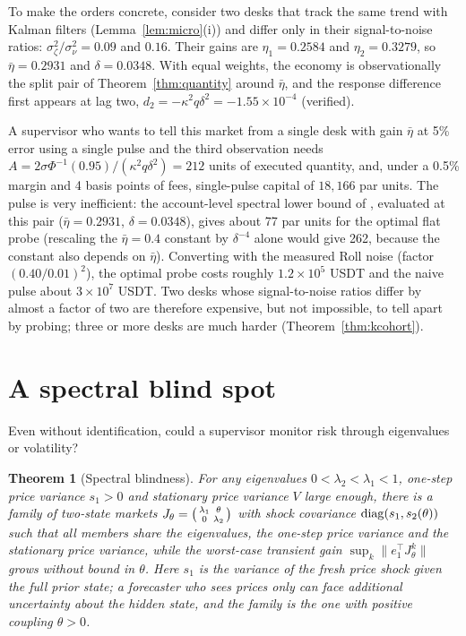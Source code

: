 \documentclass[12pt]{article}
\newtheorem{theorem}{Theorem}[section]
\theoremstyle{definition}
\theoremstyle{remark}
\begin{document}
To make the orders concrete, consider two desks that track the same trend with Kalman filters (Lemma~\ref{lem:micro}(i)) and differ only in their signal-to-noise ratios: $\sigma_\zeta^2/\sigma_\nu^2=0.09$ and $0.16$. Their gains are $\eta_1=0.2584$ and $\eta_2=0.3279$, so $\bar\eta=0.2931$ and $\delta=0.0348$. With equal weights, the economy is observationally the split pair of Theorem~\ref{thm:quantity} around $\bar\eta$, and the response difference first appears at lag two, $d_2=-\kappa^2q\delta^2=-1.55\times10^{-4}$ (verified).

A supervisor who wants to tell this market from a single desk with gain $\bar\eta$ at 5\% error using a single pulse and the third observation needs $A=2\sigma\Phi^{-1}(0.95)/(\kappa^2q\delta^2)=212$ units of executed quantity, and, under a 0.5\% margin and 4 basis points of fees, single-pulse capital of $18{,}166$ par units. The pulse is very inefficient: the account-level spectral lower bound of \citet{niroula2026a}, evaluated at this pair ($\bar\eta=0.2931$, $\delta=0.0348$), gives about 77 par units for the optimal flat probe (rescaling the $\bar\eta=0.4$ constant by $\delta^{-4}$ alone would give 262, because the constant also depends on $\bar\eta$). Converting with the measured Roll noise (factor $(0.40/0.01)^2$), the optimal probe costs roughly $1.2\times10^5$ USDT and the naive pulse about $3\times10^7$ USDT. Two desks whose signal-to-noise ratios differ by almost a factor of two are therefore expensive, but not impossible, to tell apart by probing; three or more desks are much harder (Theorem~\ref{thm:kcohort}).

\section{A spectral blind spot}\label{sec:blind}

Even without identification, could a supervisor monitor risk through eigenvalues or volatility?

\begin{theorem}[Spectral blindness]\label{thm:blind}
For any eigenvalues $0<\lambda_2<\lambda_1<1$, one-step price variance $s_1>0$ and stationary price variance $V$ large enough, there is a family of two-state markets $J_\theta=\begin{psmallmatrix}\lambda_1&\theta\\0&\lambda_2\end{psmallmatrix}$ with shock covariance ${\rm diag}(s_1,s_2(\theta))$ such that all members share the eigenvalues, the one-step price variance and the stationary price variance, while the worst-case transient gain $\sup_k\|e_1^\top J_\theta^k\|$ grows without bound in $\theta$. Here $s_1$ is the variance of the fresh price shock given the full prior state; a forecaster who sees prices only can face additional uncertainty about the hidden state, and the family is the one with positive coupling $\theta>0$.
\end{theorem}
\end{document}
